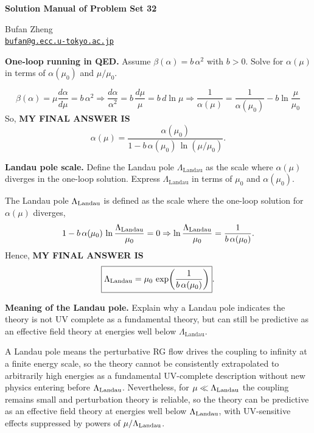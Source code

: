 \resetproblem
\begin{center}
    {\LARGE \textbf{Solution Manual of Problem Set 32} \par}
    \vspace{1em}
    {\large Bufan Zheng\\ \href{mailto:bufan@g.ecc.u-tokyo.ac.jp}{\texttt{bufan@g.ecc.u-tokyo.ac.jp}} \par}
\end{center}

\begin{problem}
    \textbf{One-loop running in QED.} Assume \(\beta(\alpha)=b\,\alpha^2\) with \(b>0\). Solve for \(\alpha(\mu)\) in terms of \(\alpha(\mu_0)\) and \(\mu/\mu_0\).
\end{problem}
\begin{solution}[32.1]
	\[
	\beta(\alpha)=\mu\frac{d\alpha}{d\mu}=b\,\alpha^2\Rightarrow
	\frac{d\alpha}{\alpha^2}=b\,\frac{d\mu}{\mu}=b\,d\ln\mu
	\Rightarrow 	\frac{1}{\alpha(\mu)}=\frac{1}{\alpha(\mu_0)}-b\ln\frac{\mu}{\mu_0}
	\]
    So, \textbf{MY FINAL ANSWER IS}
	\[
	\boxed{\alpha(\mu)=\frac{\alpha(\mu_0)}{1-b\,\alpha(\mu_0)\,\ln(\mu/\mu_0)}}.
	\]
\end{solution}
\begin{problem}
    \textbf{Landau pole scale.} Define the Landau pole \(\Lambda_{\text{Landau}}\) as the scale where \(\alpha(\mu)\) diverges in the one-loop solution. Express \(\Lambda_{\text{Landau}}\) in terms of \(\mu_0\) and \(\alpha(\mu_0)\).
\end{problem}
\begin{solution}[32.2]
	The Landau pole \(\Lambda_{\rm Landau}\) is defined as the scale where the one-loop solution for \(\alpha(\mu)\) diverges, 
	\[
	1-b\,\alpha(\mu_0)\,\ln\frac{\Lambda_{\rm Landau}}{\mu_0}=0
	\Rightarrow
	\ln\frac{\Lambda_{\rm Landau}}{\mu_0}=\frac{1}{b\,\alpha(\mu_0)}.
	\]
	Hence, \textbf{MY FINAL ANSWER IS}
	\[
	\boxed{\Lambda_{\rm Landau}=\mu_0\,\exp\!\left(\frac{1}{b\,\alpha(\mu_0)}\right)}.
	\]
\end{solution}
\begin{problem}
    \textbf{Meaning of the Landau pole.} Explain why a Landau pole indicates the theory is not UV complete as a fundamental theory, but can still be predictive as an effective field theory at energies well below \(\Lambda_{\text{Landau}}\).
\end{problem}
\begin{solution}[32.3]
	A Landau pole means the perturbative RG flow drives the coupling to infinity at a finite energy scale, so the theory cannot be consistently extrapolated to arbitrarily high energies as a fundamental UV-complete description without new physics entering before \(\Lambda_{\rm Landau}\). Nevertheless, for \(\mu\ll \Lambda_{\rm Landau}\) the coupling remains small and perturbation theory is reliable, so the theory can be predictive as an effective field theory at energies well below \(\Lambda_{\rm Landau}\), with UV-sensitive effects suppressed by powers of \(\mu/\Lambda_{\rm Landau}\).
\end{solution}
